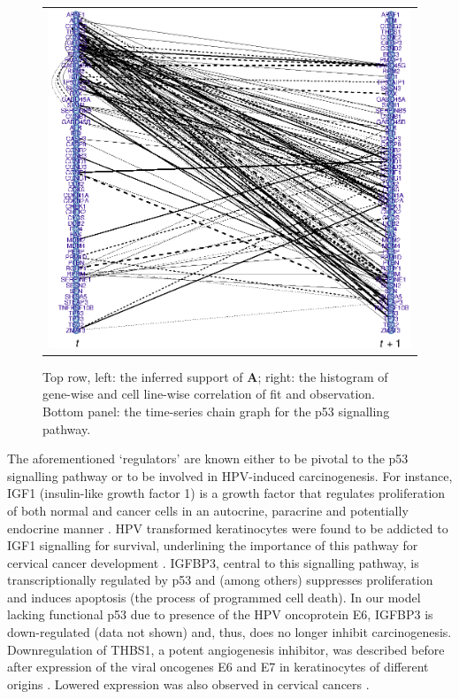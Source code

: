 \begin{figure}[h!]
\begin{tabular}{cc}
\\
\multicolumn{2}{c}{\includegraphics[scale=1.2, angle=0]{TSCG.eps}}  
\end{tabular}
\caption{Top row, left: the inferred support of $\mathbf{A}$; right: the histogram of gene-wise and cell line-wise correlation of fit and observation. Bottom panel: the time-series chain graph for the p53 signalling pathway.}
\label{fig:TSCG_supportA_fitHistogram}
\end{figure}
\afterpage{\clearpage}

The aforementioned `regulators' are known either to be pivotal to the p53 signalling pathway or to be involved in HPV-induced carcinogenesis. For instance, IGF1 (insulin-like growth factor 1) is a growth factor that regulates proliferation of both normal and cancer cells in an autocrine, paracrine \cite{Baxter2000} and potentially endocrine manner \cite{D'Ercole2001}. HPV transformed keratinocytes were found to be addicted to IGF1 signalling for survival, underlining the importance of this pathway for cervical cancer development \cite{Geiger2007}. IGFBP3, central to this signalling pathway, is transcriptionally regulated by p53 and (among others) suppresses proliferation and induces apoptosis (the process of programmed cell death). In our model lacking functional p53 due to presence of the HPV oncoprotein E6, IGFBP3 is down-regulated (data not shown) and, thus, does no longer inhibit carcinogenesis. Downregulation of THBS1, a potent angiogenesis inhibitor, was described before after expression of the viral oncogenes E6 and E7 in keratinocytes of different origins \citep{ToussaintSmith2004}. Lowered expression was also observed in cervical cancers \cite{Kodama2001}. 


